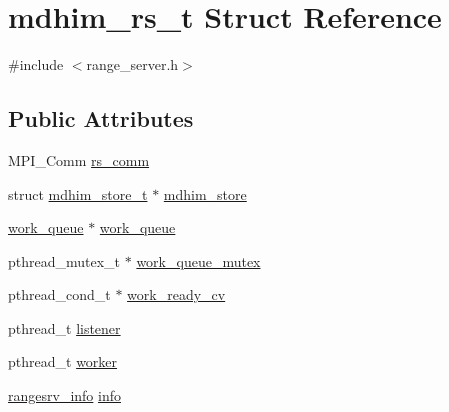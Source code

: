 \hypertarget{structmdhim__rs__t}{\section{mdhim\-\_\-rs\-\_\-t Struct Reference}
\label{structmdhim__rs__t}
}


{\ttfamily \#include $<$range\-\_\-server.\-h$>$}

\subsection*{Public Attributes}
\begin{DoxyCompactItemize}
\item 
M\-P\-I\-\_\-\-Comm \hyperlink{structmdhim__rs__t_a0ed34bdf133e1d59d83d44d0fda49683}{rs\-\_\-comm}
\item 
struct \hyperlink{structmdhim__store__t}{mdhim\-\_\-store\-\_\-t} $\ast$ \hyperlink{structmdhim__rs__t_aa393b01287a2253acff72c03cc5a83c5}{mdhim\-\_\-store}
\item 
\hyperlink{structwork__queue}{work\-\_\-queue} $\ast$ \hyperlink{structmdhim__rs__t_ab9b9e9145d08a9311917f42719937acc}{work\-\_\-queue}
\item 
pthread\-\_\-mutex\-\_\-t $\ast$ \hyperlink{structmdhim__rs__t_ab2c8635cf5b4ab05bdf8385960e3c490}{work\-\_\-queue\-\_\-mutex}
\item 
pthread\-\_\-cond\-\_\-t $\ast$ \hyperlink{structmdhim__rs__t_ab62cc2fae8553bb08e04f4365a94ec93}{work\-\_\-ready\-\_\-cv}
\item 
pthread\-\_\-t \hyperlink{structmdhim__rs__t_a993ccccd48dfdf22dd1ced2578ed15e2}{listener}
\item 
pthread\-\_\-t \hyperlink{structmdhim__rs__t_a0d5b280f18a5ff536779911d65a50529}{worker}
\item 
\hyperlink{structrangesrv__info}{rangesrv\-\_\-info} \hyperlink{structmdhim__rs__t_a23b6bfa000c31bbee0e71c4b6fbed2e9}{info}
\end{DoxyCompactItemize}


